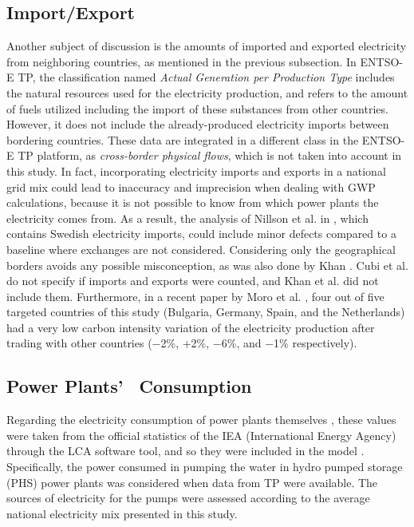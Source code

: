 {\subsection*{Import/Export}
Another subject of discussion is the amounts of imported and exported  electricity from neighboring countries, as mentioned in the previous subsection. In ENTSO-E TP, the classification named \textit{Actual Generation per Production Type} includes the natural resources used for the electricity production, and refers to the amount of fuels utilized including the import of these substances from other countries. However, it does not include the already-produced electricity imports between bordering countries. These data are integrated in a different class in the ENTSO-E TP platform, as \textit{cross-border physical flows}, which is not taken into account in this study. In fact, incorporating electricity imports and exports in a national grid mix could lead to inaccuracy and imprecision when dealing with GWP calculations, because it is not possible to know from which power plants the electricity comes from. As a result, the analysis of Nillson et al. in \cite{Nilsson2017AssessingEmissions}, which contains Swedish electricity imports, could include minor defects compared to a baseline where exchanges are not considered. Considering only the geographical borders avoids any possible misconception, as was also done by Khan \cite{Khan2018}. Cubi et al. \cite{Cubi2015IncorporationAssessment} do not specify if imports and exports were counted, and Khan et al. \cite{Khan2018AnalysisIntensity} did not include them. Furthermore, in a recent paper by Moro et al. \cite{Moro2017}, four out of five targeted countries of this study (Bulgaria, Germany, Spain, and the Netherlands) had a very low carbon intensity variation of the electricity production after trading with other countries ($-$2\%, +2\%, $-$6\%, and $-$1\% respectively).



\subsection*{Power Plants{'}%
~Consumption}
Regarding {the electricity consumption of power plants themselves}%
, these values were taken from the official statistics of the IEA (International Energy Agency) through the LCA software tool, and so they were included in the model \cite{PEInternational2014GaBiV6}. Specifically, the power consumed in pumping the water in hydro pumped storage (PHS) power plants was considered when data from TP were available. The sources of electricity for the pumps were assessed according to the average national electricity mix presented in this study.

}
